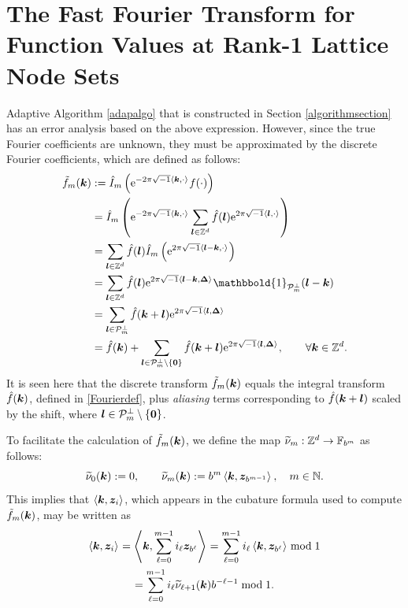\documentclass[graybox]{svmult}
\newcommand{\Z}{\mathbb{Z}} %
\newcommand{\N}{\mathbb{N}} %
\newcommand{\F}{\mathbb{F}} %
\newcommand{\bszero}{\boldsymbol{0}} %
\newcommand{\bsz}{\boldsymbol{z}}    %
\newcommand{\bsDelta}{\boldsymbol{\Delta}}    %
\newcommand{\ind}{\mathbbold{1}}
\begin{document}
\section{The Fast Fourier Transform for Function Values at Rank-1 Lattice Node Sets}\label{FFT}

Adaptive Algorithm \ref{adapalgo} that is constructed in Section \ref{algorithmsection} has an error analysis based on the above expression.  However, since the true Fourier coefficients are unknown, they must be approximated by the discrete Fourier coefficients, which are defined as follows:
\begin{subequations} \label{tfdefalias}
\begin{align}
\tf_m(\bsk)
&:= \hI_m\left( \E^{-2 \pi \sqrt{-1} \ip{\bsk}{\cdot}} f(\cdot) \right) \label{tfdef}\\
\nonumber
& = \hI_m\left( \E^{-2 \pi \sqrt{-1} \ip{\bsk}{\cdot}} \sum_{\bsl \in \Z^d} \hf(\bsl) \E^{2 \pi \sqrt{-1} \ip{\bsl}{\cdot}}  \right) \\
\nonumber
& = \sum_{\bsl \in \Z^d} \hf(\bsl) \hI_m\left( \E^{2 \pi \sqrt{-1} \ip{\bsl-\bsk}{\cdot}}  \right) \\
\nonumber
& = \sum_{\bsl \in \Z^d} \hf(\bsl) \E^{2 \pi \sqrt{-1} \ip{\bsl - \bsk}{\bsDelta}} \ind_{\cp_m^{\perp}}(\bsl - \bsk) \\
\nonumber
& = \sum_{\bsl \in \cp^{\perp}_m} \hf(\bsk+\bsl) \E^{2 \pi \sqrt{-1} \ip{\bsl }{\bsDelta}} \\
&= \hf(\bsk) + \sum_{\bsl \in \cp^{\perp}_m\setminus \{\bszero\}} \hf(\bsk+\bsl) \E^{2 \pi \sqrt{-1} \ip{\bsl }{\bsDelta}}, \qquad \forall \bsk \in \Z^d. \label{tfassum}
\end{align}
\end{subequations}
It is seen here that the discrete transform $\tilde{f}_m(\boldsymbol{k})$ equals the integral transform $\hat{f}(\boldsymbol{k})$, defined in \eqref{Fourierdef}, plus \emph{aliasing} terms corresponding to $\hat{f}(\boldsymbol{k}+\boldsymbol{l})$ scaled by the shift, where $\bsl \in \cp_{m}^{\perp}\setminus \left\{\bszero\right\}$.


To facilitate the calculation of $\tilde{f}_m(\boldsymbol{k})$, we define the map $\tnu_m : \Z^d \to \F_{b^m}$ as follows:
\begin{equation} \label{kdotzbm}
\nonumber
\tnu_{0}(\bsk) := 0, \qquad
\tnu_{m}(\bsk) := b^{m} \ip{\bsk}{\bsz_{b^{m-1}}}, \quad m \in \N.
\end{equation}
This implies that $\ip{\bsk}{\bsz_i}$, which appears in the cubature formula used to compute $\tilde{f}_m(\boldsymbol{k})$, may be written as
\begin{multline} \label{kdotzi}
\ip{\bsk}{\bsz_i} = \ip{\bsk}{\sum_{\ell=0}^{m-1} i_\ell \bsz_{b^{\ell}}} = \sum_{\ell=0}^{m-1} i_\ell \ip{\bsk}{\bsz_{b^{\ell}}} \bmod 1 \\
=\sum_{\ell=0}^{m-1} i_\ell \tnu_{\ell+1}(\bsk)  b^{-\ell-1} \bmod 1.
\end{multline}
\end{document}
